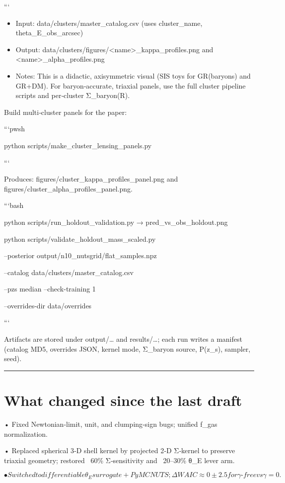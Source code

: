 \documentclass[11pt,a4paper]{article}
\begin{document}
```


\begin{itemize}
\item Input: data/clusters/master\_catalog.csv (uses cluster\_name, theta\_E\_obs\_arcsec)
\item Output: data/clusters/figures/<name>\_kappa\_profiles.png and <name>\_alpha\_profiles.png
\item Notes: This is a didactic, axisymmetric visual (SIS toys for GR(baryons) and GR+DM). For baryon‑accurate, triaxial panels, use the full cluster pipeline scripts and per‑cluster Σ\_baryon(R).
\end{itemize}


Build multi‑cluster panels for the paper:


```pwsh

python scripts/make\_cluster\_lensing\_panels.py

```


Produces: figures/cluster\_kappa\_profiles\_panel.png and figures/cluster\_alpha\_profiles\_panel.png.


```bash

python scripts/run\_holdout\_validation.py → pred\_vs\_obs\_holdout.png  

python scripts/validate\_holdout\_mass\_scaled.py \

  --posterior output/n10\_nutsgrid/flat\_samples.npz \

  --catalog data/clusters/master\_catalog.csv \

  --pzs median --check-training 1 \

  --overrides-dir data/overrides

```


Artifacts are stored under output/… and results/…; each run writes a manifest (catalog MD5, overrides JSON, kernel mode, Σ\_baryon source, P(z\_s), sampler, seed).


\medskip\hrule\medskip


\section{What changed since the last draft}


• Fixed Newtonian‑limit, unit, and clumping‑sign bugs; unified f\_gas normalization.  

• Replaced spherical 3‑D shell kernel by projected 2‑D Σ‑kernel to preserve triaxial geometry; restored ~60\% Σ‑sensitivity and ~20–30\% θ\_E lever arm.  

\[
• Switched to differentiable θ_E surrogate + PyMC NUTS; ΔWAIC ≈ 0 ± 2.5 for γ‑free vs γ=0.
\]
\end{document}
